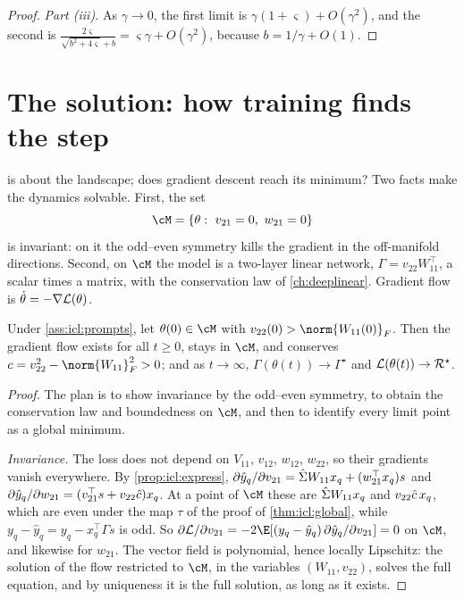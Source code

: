 \begin{refsection}
\begin{proof}
\emph{Part (iii).} As $\gamma\to0$, the first limit is $\gamma(1+\varsigma)+O(\gamma^2)$, and the second is $\frac{2\varsigma}{\sqrt{b^2+4\varsigma}+b}=\varsigma\gamma+O(\gamma^2)$, because $b=1/\gamma+O(1)$.
\end{proof}

\section{The solution: how training finds the step}\label{sec:icl:dynamics}

 is about the landscape; does gradient descent reach its minimum? Two facts make the dynamics solvable. First, the set
\[
  \cM=\{\theta:\ v_{21}=0,\ w_{21}=0\}
\]
is invariant: on it the odd--even symmetry kills the gradient in the off-manifold directions. Second, on $\cM$ the model is a two-layer linear network, $\Gamma=v_{22}W_{11}^\top$, a scalar times a matrix, with the conservation law of \cref{ch:deeplinear}. Gradient flow is $\dot\theta=-\nabla\mathcal{L}(\theta)$.

\begin{theorem}\label{thm:icl:flow}
Under \cref{ass:icl:prompts}, let $\theta(0)\in\cM$ with $v_{22}(0)>\norm{W_{11}(0)}_F$. Then the gradient flow exists for all $t\ge0$, stays in $\cM$, and conserves $c=v_{22}^2-\norm{W_{11}}_F^2>0$; and as $t\to\infty$, $\Gamma(\theta(t))\to\Gamma^\star$ and $\mathcal{L}(\theta(t))\to\mathcal{R}^\star$.
\end{theorem}

\begin{proof}
The plan is to show invariance by the odd--even symmetry, to obtain the conservation law and boundedness on $\cM$, and then to identify every limit point as a global minimum.

\emph{Invariance.} The loss does not depend on $V_{11}$, $v_{12}$, $w_{12}$, $w_{22}$, so their gradients vanish everywhere. By \cref{prop:icl:express}, $\partial\hat y_q/\partial v_{21}=\hat\Sigma W_{11}x_q+(w_{21}^\top x_q)s$ and $\partial\hat y_q/\partial w_{21}=(v_{21}^\top s+v_{22}\hat c)x_q$. At a point of $\cM$ these are $\hat\Sigma W_{11}x_q$ and $v_{22}\hat c\,x_q$, which are even under the map $\tau$ of the proof of \cref{thm:icl:global}, while $y_q-\hat y_q=y_q-x_q^\top\Gamma s$ is odd. So $\partial\Loss/\partial v_{21}=-2\E[(y_q-\hat y_q)\,\partial\hat y_q/\partial v_{21}]=0$ on $\cM$, and likewise for $w_{21}$. The vector field is polynomial, hence locally Lipschitz: the solution of the flow restricted to $\cM$, in the variables $(W_{11},v_{22})$, solves the full equation, and by uniqueness it is the full solution, as long as it exists.


\end{proof}
\end{refsection}
